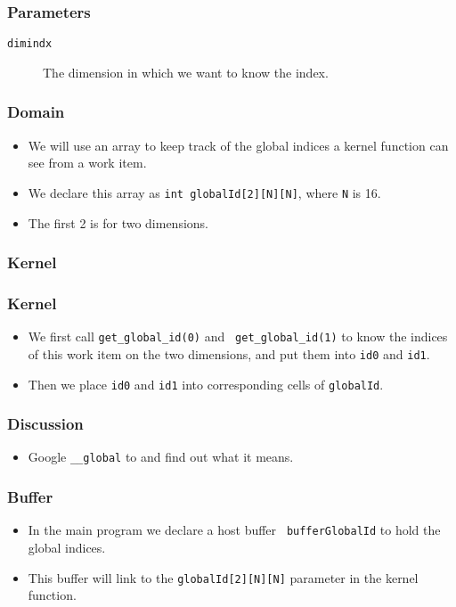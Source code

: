 \documentclass{beamer}
\begin{document}
\begin{frame}
  \frametitle{Parameters}
  \begin{description}
  \item [\tt dimindx] The dimension in which we want to know the
    index.
  \end{description}
\end{frame}

\begin{frame}
  \frametitle{Domain}
  \begin{itemize}
    \item We will use an array to keep track of the global indices a
      kernel function can see from a work item.
      \item We declare this array as {\tt int globalId[2][N][N]},
        where {\tt N} is 16.
      \item The first 2 is for two dimensions.
  \end{itemize}
\end{frame}

\begin{frame}
  \frametitle{Kernel}
\end{frame}

\begin{frame}
  \frametitle{Kernel}
  \begin{itemize}
  \item We first call {\tt get\_global\_id(0)} and {\tt
    get\_global\_id(1)} to know the indices of this work item on the
    two dimensions, and put them into {\tt id0} and {\tt id1}.
  \item Then we place {\tt id0} and {\tt id1} into corresponding
        cells of {\tt globalId}.
  \end{itemize}
\end{frame}

\begin{frame}
  \frametitle{Discussion}
  \begin{itemize}
    \item Google {\tt \_\_global} to and find out what it means.
  \end{itemize}
\end{frame}

\begin{frame}
  \frametitle{Buffer}
  \begin{itemize}
    \item In the main program we declare a host buffer {\tt
      bufferGlobalId} to hold the global indices.
    \item This buffer will link to the {\tt globalId[2][N][N]}
      parameter in the kernel function.
  \end{itemize}
\end{frame}
\end{document}

